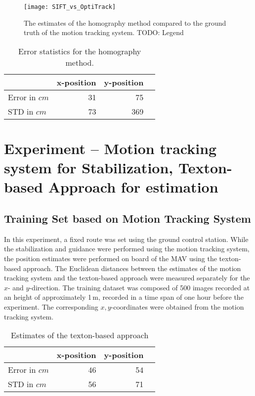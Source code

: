 \begin{figure}[h!]
\begin{center}
\texttt{[image: SIFT\_vs\_OptiTrack]}
\caption{{\label{fig:flightpath} The estimates of the homography
    method compared to the ground truth of the motion tracking system.
    TODO: Legend%
  }}
\end{center}
\end{figure}

\begin{table}[H]
  \centering
  \begin{tabular}{lrrr}
    \toprule
    & x-position & y-position\\
    \midrule
    Error in $cm$ & 31 & 75\\
    STD in $cm$ & 73 & 369\\
    \bottomrule
  \end{tabular}
  \caption[Error statistics homography method.]{Error statistics for the homography method.}
  \label{tab:homoerror}
\end{table}


\section{Experiment -- Motion tracking system for Stabilization,
  Texton-based Approach for estimation}

\subsection{Training Set based on Motion Tracking System}
\label{sec:experiment-real}

In this experiment, a fixed route was set using the ground control
station. While the stabilization and guidance were performed using the
motion tracking system, the position estimates were performed on board
of the MAV using the texton-based approach. The Euclidean distances
between the estimates of the motion tracking system and the
texton-based approach were measured separately for the $x$- and
$y$-direction.  The training dataset was composed of 500 images
recorded at an height of approximately 1\,m, recorded in a time span
of one hour before the experiment. The corresponding $x,y$-coordinates
were obtained from the motion tracking system.

\begin{table}[H]
  \centering
  \begin{tabular}{lrrr}
    \toprule
    & x-position & y-position\\
    \midrule
    Error in $cm$ & 46 & 54\\
    STD in $cm$ & 56 & 71\\
    \bottomrule
  \end{tabular}
  \caption[Estimates of the texton-based approach]{Estimates of the texton-based approach}
  \label{tab:route}
\end{table}

